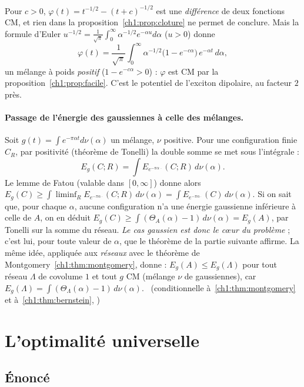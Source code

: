 \begin{example}\label{ch1:ex:dipole}
Pour $c>0$, $\varphi(t)=t^{-1/2}-(t+c)^{-1/2}$ est une \emph{différence} de deux fonctions CM, et rien dans la proposition~\ref{ch1:prop:cloture} ne
permet de conclure. Mais la formule d'Euler $u^{-1/2}=\frac{1}{\sqrt\pi}\int_0^\infty \alpha^{-1/2}e^{-\alpha u}d\alpha$ ($u>0$) donne
\[
  \varphi(t)=\frac{1}{\sqrt\pi}\int_0^\infty\alpha^{-1/2}\bigl(1-e^{-c\alpha}\bigr)\,e^{-\alpha t}\,d\alpha ,
\]
un mélange à poids \emph{positif} ($1-e^{-c\alpha}>0$) : $\varphi$ est CM par la proposition~\ref{ch1:prop:facile}. C'est le potentiel de l'exciton
dipolaire, au facteur $2$ près. \tierC{}
\end{example}

\paragraph{Passage de l'énergie des gaussiennes à celle des mélanges.} Soit $g(t)=\int e^{-\pi\alpha t}d\nu(\alpha)$ un mélange, $\nu$ positive.
Pour une configuration finie $C_R$, par positivité (théorème de Tonelli) la double somme se met sous l'intégrale :
\[
  E_g(C;R)=\int E_{e^{-\pi\alpha\,\cdot}}(C;R)\,d\nu(\alpha).
\]
Le lemme de Fatou (valable dans $[0,\infty]$) donne alors $E_g(C)\ge\int\liminf_RE_{e^{-\pi\alpha\cdot}}(C;R)\,d\nu(\alpha)=\int E_{e^{-\pi\alpha\cdot}}(C)\,d\nu(\alpha)$.
Si on sait que, pour chaque $\alpha$, aucune configuration n'a une énergie gaussienne inférieure à celle de $A$, on en déduit
$E_g(C)\ge\int(\Theta_A(\alpha)-1)\,d\nu(\alpha)=E_g(A)$, par Tonelli sur la somme du réseau. \tierC{}
\emph{Le cas gaussien est donc le c\oe ur du problème} ; c'est lui, pour toute valeur de $\alpha$, que le théorème de la partie suivante affirme.
La même idée, appliquée aux \emph{réseaux} avec le théorème de Montgomery~\ref{ch1:thm:montgomery}, donne : $E_g(A)\le E_g(\Lambda)$ pour tout réseau $\Lambda$ de
covolume $1$ et tout $g$ CM (mélange $\nu$ de gaussiennes), car $E_g(\Lambda)=\int(\Theta_\Lambda(\alpha)-1)\,d\nu(\alpha)$. \tierC{}\ (conditionnelle à~\ref{ch1:thm:montgomery} et à~\ref{ch1:thm:bernstein}, \tierL{})

\section{L'optimalité universelle}
\label{ch1:sec:univ}

\subsection{Énoncé}

